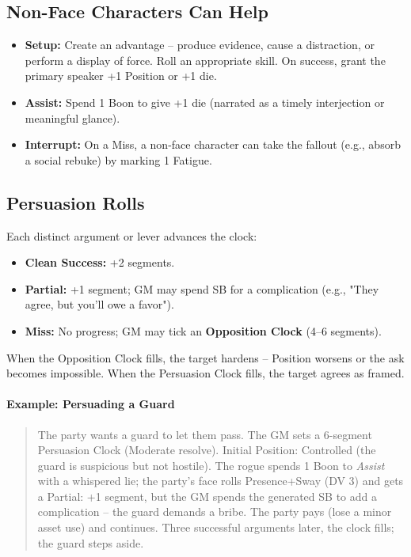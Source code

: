 \subsection{Non-Face Characters Can Help}
\begin{itemize}[leftmargin=*]
  \item \textbf{Setup:} Create an advantage -- produce evidence, cause a distraction, or perform a display of force. Roll an appropriate skill. On success, grant the primary speaker +1 Position or +1 die.
  \item \textbf{Assist:} Spend 1 Boon to give +1 die (narrated as a timely interjection or meaningful glance).
  \item \textbf{Interrupt:} On a Miss, a non-face character can take the fallout (e.g., absorb a social rebuke) by marking 1 Fatigue.
\end{itemize}

\subsection{Persuasion Rolls}
Each distinct argument or lever advances the clock:
\begin{itemize}[leftmargin=*]
  \item \textbf{Clean Success:} +2 segments.
  \item \textbf{Partial:} +1 segment; GM may spend SB for a complication (e.g., "They agree, but you'll owe a favor").
  \item \textbf{Miss:} No progress; GM may tick an \textbf{Opposition Clock} (4--6 segments).
\end{itemize}
When the Opposition Clock fills, the target hardens -- Position worsens or the ask becomes impossible.  
When the Persuasion Clock fills, the target agrees as framed.

\paragraph{Example: Persuading a Guard}
\begin{quote}
The party wants a guard to let them pass. The GM sets a 6-segment Persuasion Clock (Moderate resolve). Initial Position: Controlled (the guard is suspicious but not hostile). The rogue spends 1 Boon to \textit{Assist} with a whispered lie; the party’s face rolls Presence+Sway (DV 3) and gets a Partial: +1 segment, but the GM spends the generated SB to add a complication – the guard demands a bribe. The party pays (lose a minor asset use) and continues. Three successful arguments later, the clock fills; the guard steps aside.
\end{quote}

